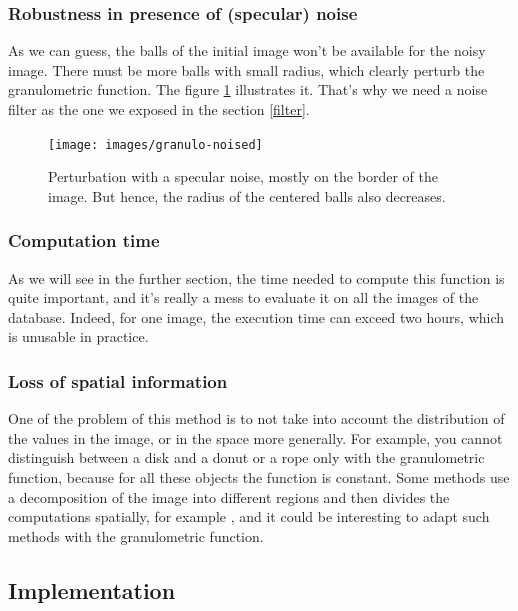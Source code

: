 \subsubsection{Robustness in presence of (specular) noise}

As we can guess, the balls of the initial image won't be available for the noisy image. There must be more balls with small radius, which clearly perturb the granulometric function. The figure \ref{device9-6-noised} illustrates it. That's why we need a noise filter as the one we exposed in the section \ref{filter}.

\begin{figure}[!ht]
    \centering
    \texttt{[image: images/granulo-noised]}
    \caption{Perturbation with a specular noise, mostly on the border of the image. But hence, the radius of the centered balls also decreases.}
	\label{device9-6-noised}
\end{figure}

\subsubsection{Computation time}

As we will see in the further section, the time needed to compute this function is quite important, and it's really a mess to evaluate it on all the images of the database. Indeed, for one image, the execution time can exceed two hours, which is unusable in practice.

\subsubsection{Loss of spatial information}

One of the problem of this method is to not take into account the distribution of the values in the image, or in the space more generally. For example, you cannot distinguish between a disk and a donut or a rope only with the granulometric function, because for all these objects the function is constant. Some methods use a decomposition of the image into different regions and then divides the computations spatially, for example \cite{spacial-decompo}, and it could be interesting to adapt such methods with the granulometric function.


\subsection{Implementation}

